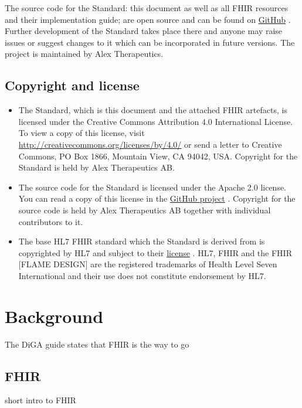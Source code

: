 \documentclass[12px]{report}
\begin{document}
The source code for the Standard: this document as well as all FHIR resources and their implementation guide; are open source and can be 
found on \href{https://github.com/alex-therapeutics/diga-nicotine-usage-fhir}{GitHub} \cite{github}. Further development of the Standard
takes place there and anyone may raise issues or suggest changes to it which can be incorporated in future versions.
The project is maintained by Alex Therapeutics.

\section{Copyright and license}

\begin{itemize}
    \item The Standard, which is this document and the attached FHIR artefacts, is licensed under the Creative Commons Attribution 4.0 International License. 
To view a copy of this license, visit \href{http://creativecommons.org/licenses/by/4.0/}{http://creativecommons.org/licenses/by/4.0/} or send a letter to Creative Commons, PO Box 1866, Mountain View, CA 94042, USA.
Copyright for the Standard is held by Alex Therapeutics AB. 
    \item The source code for the Standard is licensed under the Apache 2.0 license. 
You can read a copy of this license in the \href{https://github.com/alex-therapeutics/diga-nicotine-usage-fhir/blob/main/LICENSE}{GitHub project} \cite{github}.
Copyright for the source code is held by Alex Therapeutics AB together with individual contributors to it.
    \item The base HL7\textsuperscript{\textregistered} FHIR\textsuperscript{\textregistered} standard which the Standard is derived from is copyrighted by HL7 and subject to their \href{http://hl7.org/fhir/license.html}{license} \cite{fhirlic}.
HL7, FHIR and the FHIR [FLAME DESIGN] are the registered trademarks of Health Level Seven International and their use does not constitute endorsement by HL7.
\end{itemize}

\chapter{Background}

The DiGA guide states that FHIR is the way to go

\section{FHIR}
short intro to FHIR
\end{document}
